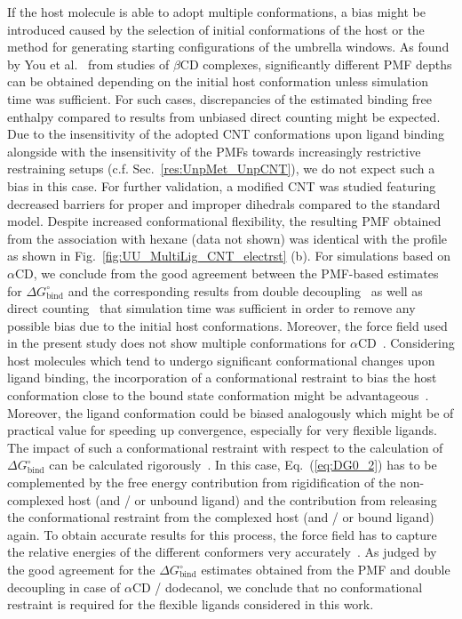 \documentclass[9pt,lessons,pubversion]{livecoms}
\begin{document}
If the host molecule is able to adopt multiple conformations, a bias might be introduced caused by the selection of initial conformations of the host or the method for generating starting configurations of the umbrella windows. 
As found by You et al.~\cite{you2019potential}  
from studies of $\beta$CD complexes, significantly different PMF depths can be obtained depending on the initial host conformation unless simulation time was sufficient.
For such cases, discrepancies of the estimated binding free enthalpy compared to results from unbiased direct counting might be expected.
Due to the insensitivity of the adopted CNT conformations upon ligand binding alongside with the insensitivity of the PMFs towards increasingly restrictive restraining setups (c.f. Sec.~\ref{res:UnpMet_UnpCNT}),  
we do not expect such a bias in this case.
For further validation, a modified CNT was studied featuring decreased barriers for proper and improper dihedrals  compared to the standard model. 
Despite increased conformational flexibility, the resulting PMF obtained from the association with hexane (data not shown) was identical with the profile as shown in Fig.~\ref{fig:UU_MultiLig_CNT_electrst} (b).
For simulations based on  $\alpha$CD, we conclude from the good agreement between the PMF-based estimates for $\Delta G^\circ_\mathrm{bind}$ and the corresponding results from 
double decoupling~\cite{markthaler2017molecular, gebhardt2016calculation}
as well as direct counting~\cite{baz2018insights} that simulation time was sufficient in order to remove any possible bias due to the initial host conformations.
Moreover, the force field used in the present study does not show multiple conformations for $\alpha$CD~\cite{gebhardt2018validation}.
Considering host molecules which tend to undergo significant conformational changes upon ligand binding, the incorporation of a conformational restraint to bias the host conformation close to the bound state conformation might be advantageous~\cite{woo2005calculation}.
Moreover, the ligand conformation could be biased analogously which might be of practical value for speeding up convergence, especially for very flexible ligands.
The impact of such a conformational restraint with respect to the calculation of $\Delta G^\circ_\mathrm{bind}$ can be calculated rigorously~\cite{woo2005calculation}. 
In this case, Eq.~(\ref{eq:DG0_2}) has to be complemented by the free energy contribution from rigidification of the non-complexed host (and / or unbound ligand) and 
the contribution from releasing the conformational restraint from the complexed host (and / or bound ligand) again. 
To obtain accurate results for this process, the force field has to capture the relative energies of the different conformers very accurately~\cite{tirado2006contribution}.
As judged by the good agreement for the $\Delta G^\circ_\mathrm{bind}$ estimates obtained from the PMF and double decoupling in case of $\alpha$CD / dodecanol, 
we conclude that no conformational restraint is required for the flexible ligands considered in this work.
\end{document}

